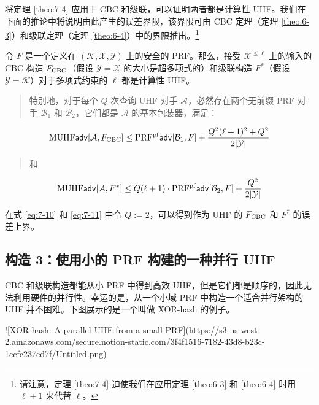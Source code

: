 \begin{snote}
将定理 \ref{theo:7-4} 应用于 CBC 和级联，可以证明两者都是计算性 UHF。我们在下面的推论中将说明由此产生的误差界限，该界限可由 CBC 定理（定理 \ref{theo:6-3}）和级联定理（定理 \ref{theo:6-4}）中的界限推出。\footnote{请注意，定理 \ref{theo:7-4} 迫使我们在应用定理 \ref{theo:6-3} 和 \ref{theo:6-4} 时用 $\ell+1$ 来代替 $\ell$。}
\end{snote}

\begin{corollary}\label{cor:7-5}
令 $F$ 是一个定义在 $(\mathcal{K},\mathcal{X},\mathcal{Y})$ 上的安全的 PRF。那么，接受 $\mathcal{X}^{\leq\ell}$ 上的输入的 CBC 构造 $F_{\rm CBC}$（假设 $\mathcal{Y}=\mathcal{X}$ 的大小是超多项式的）和级联构造 $F^*$（假设 $\mathcal{Y}=\mathcal{K}$）对于多项式约束的 $\ell$ 都是计算性 UHF。
\begin{quote}
特别地，对于每个 $Q$ 次查询 UHF 对手 $\mathcal{A}$，必然存在两个无前缀 PRF 对手 $\mathcal{B}_1$ 和 $\mathcal{B}_2$，它们都是 $\mathcal{A}$ 的基本包装器，满足：
\end{quote}
\begin{equation}\label{eq:7-10}
{\rm MUHF}\mathsf{adv}[\mathcal{A},F_{\rm CBC}]\leq{\rm PRF^{pf}}\mathsf{adv}[\mathcal{B}_1,F]+\frac{Q^2(\ell+1)^2+Q^2}{2|\mathcal{Y}|}
\end{equation}
\begin{quote}
和
\end{quote}
\begin{equation}\label{eq:7-11}
{\rm MUHF}\mathsf{adv}[\mathcal{A},F^*]\leq Q(\ell+1)\cdot{\rm PRF^{pf}}\mathsf{adv}[\mathcal{B}_2,F]+\frac{Q^2}{2|\mathcal{Y}|}
\end{equation}
\end{corollary}

\noindent
在式 \ref{eq:7-10} 和 \ref{eq:7-11} 中令 $Q:=2$，可以得到作为 UHF 的 $F_{\rm CBC}$ 和 $F^*$ 的误差上界。

\subsection{构造 3：使用小的 PRF 构建的一种并行 UHF}

CBC 和级联构造都能从小 PRF 中得到高效 UHF，但是它们都是顺序的，因此无法利用硬件的并行性。幸运的是，从一个小域 PRF 中构造一个适合并行架构的 UHF 并不困难。下图展示的是一个叫做 XOR-hash 的例子。

![XOR-hash: A parallel UHF from a small PRF](https://s3-us-west-2.amazonaws.com/secure.notion-static.com/3f4f1516-7182-43d8-b23c-1ccfc237ed7f/Untitled.png)

